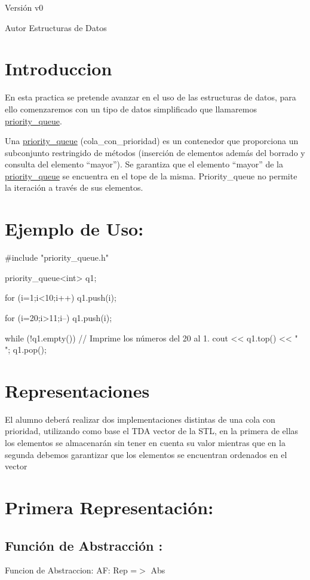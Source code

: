 \begin{DoxyVersion}{\-Versión}
v0 
\end{DoxyVersion}
\begin{DoxyAuthor}{\-Autor}
\-Estructuras de \-Datos
\end{DoxyAuthor}
\hypertarget{index_intro_sec}{}\section{\-Introduccion}\label{index_intro_sec}
\-En esta practica se pretende avanzar en el uso de las estructuras de datos, para ello comenzaremos con un tipo de datos simplificado que llamaremos \hyperlink{classpriority__queue}{priority\-\_\-queue}.

\-Una \hyperlink{classpriority__queue}{priority\-\_\-queue} (cola\-\_\-con\-\_\-prioridad) es un contenedor que proporciona un subconjunto restringido de métodos (inserción de elementos además del borrado y consulta del elemento “mayor”). \-Se garantiza que el elemento “mayor” de la \hyperlink{classpriority__queue}{priority\-\_\-queue} se encuentra en el tope de la misma. \-Priority\-\_\-queue no permite la iteración a través de sus elementos.\hypertarget{index_example_sec}{}\section{\-Ejemplo de Uso\-:}\label{index_example_sec}

\begin{DoxyCode}
#include "priority_queue.h"

priority_queue<int> q1;


for (i=1;i<10;i++) q1.push(i);

for (i=20;i>11;i--) q1.push(i);

while (!q1.empty())  { // Imprime los números del 20 al 1. 
     cout << q1.top() << " ";
     q1.pop();   
   }
\end{DoxyCode}
\hypertarget{index_Representaciones}{}\section{\-Representaciones}\label{index_Representaciones}
\-El alumno deberá realizar dos implementaciones distintas de una cola con prioridad, utilizando como base el \-T\-D\-A vector de la \-S\-T\-L, en la primera de ellas los elementos se almacenarán sin tener en cuenta su valor mientras que en la segunda debemos garantizar que los elementos se encuentran ordenados en el vector\hypertarget{index_primera}{}\section{\-Primera Representación\-:}\label{index_primera}
\hypertarget{index_fact_sec1}{}\subsection{\-Función de Abstracción \-:}\label{index_fact_sec1}
\-Funcion de \-Abstraccion\-: \-A\-F\-: \-Rep =$>$ \-Abs

